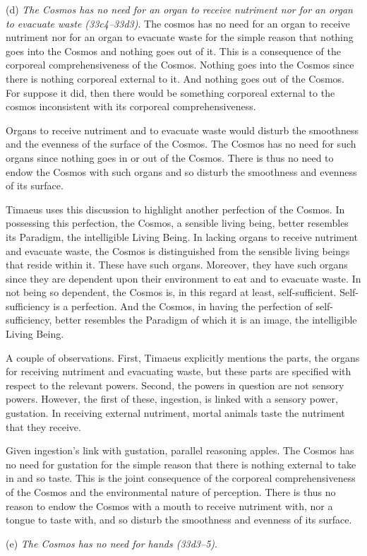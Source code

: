 (d) \emph{The Cosmos has no need for an organ to receive nutriment nor for an organ to evacuate waste (33c4--33d3)}. The cosmos has no need for an organ to receive nutriment nor for an organ to evacuate waste for the simple reason that nothing goes into the Cosmos and nothing goes out of it. This is a consequence of the corporeal comprehensiveness of the Cosmos. Nothing goes into the Cosmos since there is nothing corporeal external to it. And nothing goes out of the Cosmos. For suppose it did, then there would be something corporeal external to the cosmos inconsistent with its corporeal comprehensiveness. 

Organs to receive nutriment and to evacuate waste would disturb the smoothness and the evenness of the surface of the Cosmos. The Cosmos has no need for such organs since nothing goes in or out of the Cosmos. There is thus no need to endow the Cosmos with such organs and so disturb the smoothness and evenness of its surface.

Timaeus uses this discussion to highlight another perfection of the Cosmos. In possessing this perfection, the Cosmos, a sensible living being, better resembles its Paradigm, the intelligible Living Being. In lacking organs to receive nutriment and evacuate waste, the Cosmos is distinguished from the sensible living beings that reside within it. These have such organs. Moreover, they have such organs since they are dependent upon their environment to eat and to evacuate waste. In not being so dependent, the Cosmos is, in this regard at least, self-sufficient. Self-sufficiency is a perfection. And the Cosmos, in having the perfection of self-sufficiency, better resembles the Paradigm of which it is an image, the intelligible Living Being.

A couple of observations. First, Timaeus explicitly mentions the parts, the organs for receiving nutriment and evacuating waste, but these parts are specified with respect to the relevant powers. Second, the powers in question are not sensory powers. However, the first of these, ingestion, is linked with a sensory power, gustation. In receiving external nutriment, mortal animals taste the nutriment that they receive. 

Given ingestion's link with gustation, parallel reasoning apples. The Cosmos has no need for gustation for the simple reason that there is nothing external to take in and so taste. This is the joint consequence of the corporeal comprehensiveness of the Cosmos and the environmental nature of perception. There is thus no reason to endow the Cosmos with a mouth to receive nutriment with, nor a tongue to taste with, and so disturb the smoothness and evenness of its surface.

(e) \emph{The Cosmos has no need for hands (33d3--5)}.






